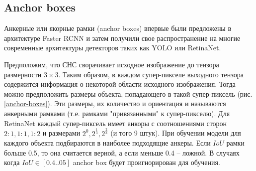 \subsection{Anchor boxes}

Анкерные или якорные рамки (anchor boxes) впервые были предложены в архитектуре Faster RCNN и затем получили свое распространение на многие современные архитектуры детекторов таких как YOLO или RetinaNet. 

Предположим, что СНС сворачивает исходное изображение до тензора размерности $3 \times 3$. Таким образом, в каждом супер-пикселе выходного тензора содержится информация о некоторой области исходного изображения. Тогда можно предположить размеры объекта, попадающего в такой супер-пиксель (рис. \ref{anchor-boxes}). Эти размеры, их количество и ориентация и называются анкерными рамками (т.е. рамками "привязанными" к супер-пикселю). Для RetinaNet каждый супер-пиксель имеет анкоры с соотношениями сторон $2:1, 1:1, 1:2$ и размерами $2^0, 2^{\frac{1}{3}}, 2^{\frac{2}{3}}$ (и того 9 штук). При обучении модели для каждого объекта подбираются в наиболее подходящие анкеры. Если $IoU$ рамки больше 0.5, то она считается верной, а если меньше 0.4 -- ложной. В случаях когда $IoU \in [0.4 .. 05]$ anchor box будет проигнорирован для обучения.

